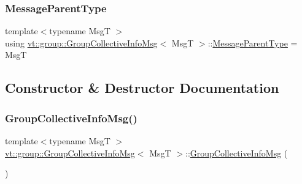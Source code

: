 \mbox{\label{structvt_1_1group_1_1_group_collective_info_msg_a4e5fd50029cce20871f7fb401f1aee5d}} 
\subsubsection{\texorpdfstring{Message\+Parent\+Type}{MessageParentType}}
{\footnotesize\ttfamily template$<$typename MsgT $>$ \\
using \hyperlink{structvt_1_1group_1_1_group_collective_info_msg}{vt\+::group\+::\+Group\+Collective\+Info\+Msg}$<$ MsgT $>$\+::\hyperlink{structvt_1_1group_1_1_group_collective_info_msg_a4e5fd50029cce20871f7fb401f1aee5d}{Message\+Parent\+Type} =  MsgT}



\subsection{Constructor \& Destructor Documentation}
\mbox{\label{structvt_1_1group_1_1_group_collective_info_msg_a92fdcd49062ed34fdb873b10e33e06f1}} 
\subsubsection{\texorpdfstring{Group\+Collective\+Info\+Msg()}{GroupCollectiveInfoMsg()}\hspace{0.1cm}{\footnotesize\ttfamily [1/2]}}
{\footnotesize\ttfamily template$<$typename MsgT $>$ \\
\hyperlink{structvt_1_1group_1_1_group_collective_info_msg}{vt\+::group\+::\+Group\+Collective\+Info\+Msg}$<$ MsgT $>$\+::\hyperlink{structvt_1_1group_1_1_group_collective_info_msg}{Group\+Collective\+Info\+Msg} (\begin{DoxyParamCaption}{ }\end{DoxyParamCaption})\hspace{0.3cm}{\ttfamily [default]}}

